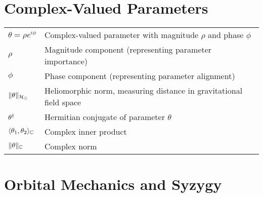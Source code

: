 \section*{Complex-Valued Parameters}

\begin{tabular}{p{3cm} p{12cm}}
$\theta = \rho e^{i\phi}$ & Complex-valued parameter with magnitude $\rho$ and phase $\phi$ \\
$\rho$ & Magnitude component (representing parameter importance) \\
$\phi$ & Phase component (representing parameter alignment) \\
$\|\theta\|_{\mathcal{H}_{\odot}}$ & Heliomorphic norm, measuring distance in gravitational field space \\
$\theta^{\dagger}$ & Hermitian conjugate of parameter $\theta$ \\
$\langle \theta_1, \theta_2 \rangle_{\mathbb{C}}$ & Complex inner product \\
$\|\theta\|_{\mathbb{C}}$ & Complex norm \\
\end{tabular}

\section*{Orbital Mechanics and Syzygy}

